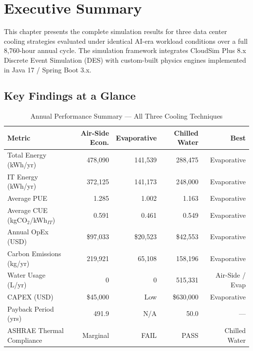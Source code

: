 \documentclass[12pt,a4paper]{report}
\begin{document}
\newpage

\chapter{Executive Summary}

This chapter presents the complete simulation results for three data center cooling strategies
evaluated under identical AI-era workload conditions over a full 8{,}760-hour annual cycle.
The simulation framework integrates CloudSim Plus 8.x Discrete Event Simulation (DES) with
custom-built physics engines implemented in Java 17 / Spring Boot 3.x.

\section{Key Findings at a Glance}

\begin{table}[H]
\centering
\caption{Annual Performance Summary --- All Three Cooling Techniques}
\label{tab:exec_summary}
\renewcommand{\arraystretch}{1.4}
\begin{tabular}{lrrrr}
\toprule
\textbf{Metric} & \textbf{Air-Side Econ.} & \textbf{Evaporative} & \textbf{Chilled Water} & \textbf{Best} \\
\midrule
Total Energy (kWh/yr) & 478{,}090 & 141{,}539 & 288{,}475 & Evaporative \\
IT Energy (kWh/yr) & 372{,}125 & 141{,}173 & 248{,}000 & Evaporative \\
Average PUE & 1.285 & 1.002 & 1.163 & Evaporative \\
Average CUE (kgCO$_2$/kWh$_{IT}$) & 0.591 & 0.461 & 0.549 & Evaporative \\
Annual OpEx (USD) & \$97{,}033 & \$20{,}523 & \$42{,}553 & Evaporative \\
Carbon Emissions (kg/yr) & 219{,}921 & 65{,}108 & 158{,}196 & Evaporative \\
Water Usage (L/yr) & 0 & 0 & 515{,}331 & Air-Side / Evap \\
CAPEX (USD) & \$45{,}000 & Low & \$630{,}000 & Evaporative \\
Payback Period (yrs) & 491.9 & N/A & 50.0 & --- \\
ASHRAE Thermal Compliance & Marginal & FAIL & PASS & Chilled Water \\
\bottomrule
\end{tabular}
\end{table}
\end{document}
